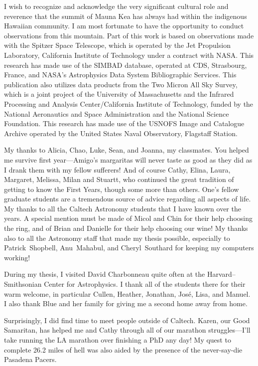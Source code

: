 \begin{acknowledgements}
I wish to recognize and acknowledge the very
significant cultural role and reverence that the summit of Mauna Kea
has always had within the indigenous Hawaiian community.  I am most
fortunate to have the opportunity to conduct observations from this
mountain.
Part of this work is based on observations made with the Spitzer Space Telescope, which is operated by the Jet Propulsion Laboratory, California Institute of Technology under a contract with NASA.
This research has made use of the SIMBAD database, operated at CDS, Strasbourg, France, and NASA's Astrophysics Data System Bibliographic Services.
This publication also utilizes data products from the Two Micron All Sky Survey, which is a joint project of the University of Massachusetts and the Infrared Processing and Analysis Center/California Institute of Technology, funded by the National Aeronautics and Space Administration and the National Science Foundation.
This research has made use of the USNOFS Image and Catalogue Archive operated by the United States Naval Observatory, Flagstaff Station.

My thanks to Alicia, Chao, Luke, Sean, and Joanna, my classmates.
You helped me survive first year---Amigo's margaritas will never taste as good as they did as I drank them with my fellow sufferers!
And of course Cathy, Elina, Laura, Margaret, Melissa, Milan and Stuartt, who continued the great tradition of getting to know the First Years, though some more than others.
One's fellow graduate students are a tremendous source of advice regarding all aspects of life.
My thanks to all the Caltech Astronomy students that I have known over the years.
A special mention must be made of Micol and Chin for their help choosing the ring, and of Brian and Danielle for their help choosing our wine!
My thanks also to all the Astronomy staff that made my thesis possible, especially to Patrick~Shopbell, Anu~Mahabul, and Cheryl~Southard for keeping my computers working!

During my thesis, I visited David Charbonneau quite often at the Harvard--Smithsonian Center for Astrophysics.
I thank all of the students there for their warm welcome, in particular Cullen, Heather, Jonathan, Jos\'{e}, Lisa, and Manuel.
I also thank Blue and her family for giving me a second home away from home.

Surprisingly, I did find time to meet people outside of Caltech.
Karen, our Good Samaritan, has helped me and Cathy through all of our marathon struggles---I'll take running the LA marathon over finishing a PhD any day!
My quest to complete 26.2 miles of hell was also aided by the presence of the never-say-die Pasadena Pacers.



\end{acknowledgements}
